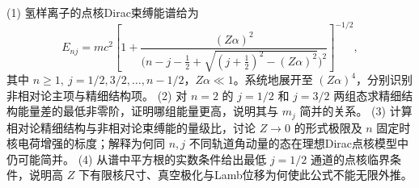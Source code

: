 (1) 氢样离子的点核Dirac束缚能谱给为
\[
E_{nj}=mc^2\left[1+\frac{(Z\alpha)^2}{\bigl(n-j-\tfrac12+\sqrt{(j+\tfrac12)^2-(Z\alpha)^2}\bigr)^2}\right]^{-1/2},
\]
其中 \(n\ge1,\ j=1/2,3/2,\ldots,n-1/2\)，\(Z\alpha\ll1\)。系统地展开至 \((Z\alpha)^4\)，分别识别非相对论主项与精细结构项。
(2) 对 \(n=2\) 的 \(j=1/2\) 和 \(j=3/2\) 两组态求精细结构能量差的最低非零阶，证明哪组能量更高，说明其与 \(m_j\) 简并的关系。
(3) 计算相对论精细结构与非相对论束缚能的量级比，讨论 \(Z\to0\) 的形式极限及 \(n\) 固定时核电荷增强的标度；解释为何同 \(n,j\) 不同轨道角动量的态在理想Dirac点核模型中仍可能简并。
(4) 从谱中平方根的实数条件给出最低 \(j=1/2\) 通道的点核临界条件，说明高 \(Z\) 下有限核尺寸、真空极化与Lamb位移为何使此公式不能无限外推。
